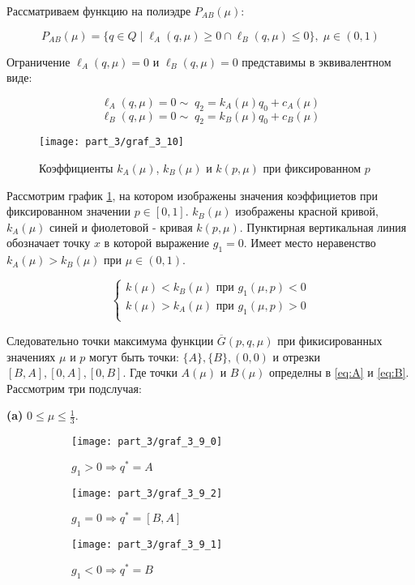 	Рассматриваем функцию на полиэдре $P_{AB}(\mu):$
	
	$$P_{AB}(\mu)=
	\{
		q \in Q \; | \;  
		\ell_A(q, \mu) \geqslant 0 \cap
	 	\ell_B(q, \mu) \leqslant 0
	\},\; \mu \in (0,1) $$

	Ограничение $\ell_A(q, \mu) = 0$ и $\ell_B(q, \mu) = 0$ представимы в 
	эквивалентном виде:
	
	$$\ell_A(q,\mu)=0 \sim \; q_2=k_A(\mu)q_0+c_A(\mu)$$
	$$\ell_B(q,\mu)=0 \sim \; q_2=k_B(\mu)q_0+c_B(\mu)$$

	
	\begin{figure}[H]
		\centering
  		\texttt{[image: part\_3/graf\_3\_10]}
  		\caption{Коэффициенты $k_A(\mu)$, $k_B(\mu)$ и $k(p,\mu)$ при фиксированном $p$}
		\label{fig:k_A,k_B,k}	
	\end{figure}	
	
	Рассмотрим график \ref{fig:k_A,k_B,k}, на котором изображены значения коэффициетов
	при фиксированном значении $p \in [0,1]$. $k_B(\mu)$ изображены красной кривой,
	$k_A(\mu)$ синей и фиолетовой - кривая $k(p, \mu)$. Пунктирная вертикальная линия
	обозначает точку $x$ в которой выражение $g_1=0$. Имеет место неравенство 
	$k_A(\mu) > k_B(\mu)$ при $\mu \in (0,1)$.
	
	$$
	\begin{cases}
	k(\mu) < k_B(\mu) \textrm{ при } g_1(\mu,p) < 0  \\
	k(\mu) > k_A(\mu) \textrm{ при } g_1(\mu,p) > 0 \\
	\end{cases}		
	$$	
	
	
	Следовательно точки максимума функции $\overline{G}(p,q,\mu)$ при фикисированных
	значениях $\mu$ и $p$ могут быть точки: 
	$\{A\}, \{B\}, (0,0)$ и отрезки $[B, A], [0, A], [0,B]$. Где точки
	$A(\mu)$ и $B(\mu)$ определны в \ref{eq:A} и \ref{eq:B}. 
	Рассмотрим три подслучая:
	
	\newpage

	\textbf{(a)} $0 \leqslant \mu \leqslant \frac{1}{3}$. 	
		
	\begin{figure}[H]
    	\centering
     	\begin{subfigure}[b]{0.3 \textwidth}
        	\centering
        	\texttt{[image: part\_3/graf\_3\_9\_0]}
        	\caption{$g_1 > 0 \Rightarrow q^*=A$}
         	\label{fig:y equals x}
     	\end{subfigure}
     	\begin{subfigure}[b]{0.3 \textwidth}
        	\centering
        	\texttt{[image: part\_3/graf\_3\_9\_2]}
        	\caption{$g_1 = 0 \Rightarrow q^*=[B,A]$}
        	\label{fig:three sin x}
     	\end{subfigure}
     	\begin{subfigure}[b]{0.3 \textwidth}
        	\centering
        	\texttt{[image: part\_3/graf\_3\_9\_1]}
        	\caption{$g_1 < 0 \Rightarrow q^*=B$}
        	\label{fig:three sin x}
     	\end{subfigure}
     	\caption{}
     	\label{fig:3_mu_0}
	\end{figure}

